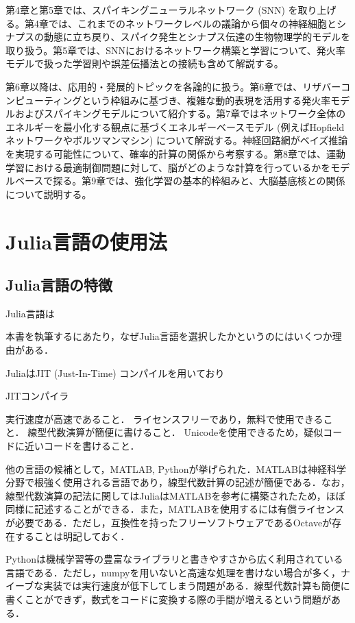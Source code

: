 \documentclass[titlepage]{ltjsbook}
\begin{document}
第4章と第5章では、スパイキングニューラルネットワーク (SNN) を取り上げる。第4章では、これまでのネットワークレベルの議論から個々の神経細胞とシナプスの動態に立ち戻り、スパイク発生とシナプス伝達の生物物理学的モデルを取り扱う。第5章では、SNNにおけるネットワーク構築と学習について、発火率モデルで扱った学習則や誤差伝播法との接続も含めて解説する。

第6章以降は、応用的・発展的トピックを各論的に扱う。第6章では、リザバーコンピューティングという枠組みに基づき、複雑な動的表現を活用する発火率モデルおよびスパイキングモデルについて紹介する。第7章ではネットワーク全体のエネルギーを最小化する観点に基づくエネルギーベースモデル (例えばHopfieldネットワークやボルツマンマシン) について解説する。神経回路網がベイズ推論を実現する可能性について、確率的計算の関係から考察する。第8章では、運動学習における最適制御問題に対して、脳がどのような計算を行っているかをモデルベースで探る。第9章では、強化学習の基本的枠組みと、大脳基底核との関係について説明する。

\section{Julia言語の使用法}
\subsection{Julia言語の特徴}
Julia言語は

本書を執筆するにあたり，なぜJulia言語を選択したかというのにはいくつか理由がある．

JuliaはJIT (Just-In-Time) コンパイルを用いており

JITコンパイラ

実行速度が高速であること．
ライセンスフリーであり，無料で使用できること．
線型代数演算が簡便に書けること．
Unicodeを使用できるため，疑似コードに近いコードを書けること．

他の言語の候補として，MATLAB, Pythonが挙げられた．MATLABは神経科学分野で根強く使用される言語であり，線型代数計算の記述が簡便である．なお，線型代数演算の記法に関してはJuliaはMATLABを参考に構築されたため，ほぼ同様に記述することができる．また，MATLABを使用するには有償ライセンスが必要である．ただし，互換性を持ったフリーソフトウェアであるOctaveが存在することは明記しておく．

Pythonは機械学習等の豊富なライブラリと書きやすさから広く利用されている言語である．ただし，numpyを用いないと高速な処理を書けない場合が多く，ナイーブな実装では実行速度が低下してしまう問題がある．線型代数計算も簡便に書くことができず，数式をコードに変換する際の手間が増えるという問題がある．
\end{document}
